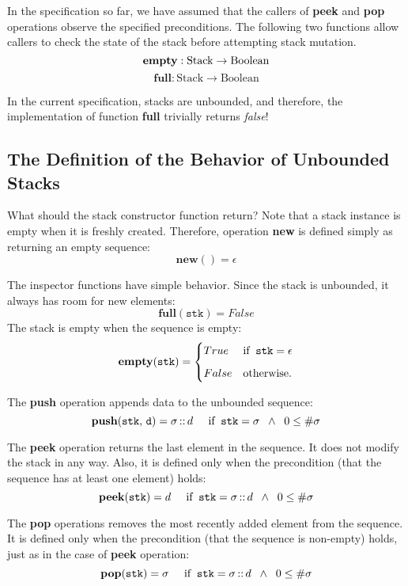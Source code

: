 \documentclass[10pt]{article}
\begin{document}
In the specification so far, we have assumed that the callers of {\textbf{peek}} and {\textbf{pop}} operations observe the specified preconditions. The following two functions allow callers to check the state of the stack before attempting stack mutation.
\[
\textbf{empty}: \mathrm{Stack} \rightarrow \mathrm{Boolean}\vspace*{4pt}\\
\]
\[
\textbf{full}: \mathrm{Stack} \rightarrow \mathrm{Boolean}
\]

\noindent In the current specification, stacks are unbounded, and therefore, the implementation of function {\textbf{full}} trivially returns \emph{false}!

\subsection{The Definition of the Behavior of Unbounded Stacks}
What should the stack constructor function return? Note that a stack instance is empty when it is freshly created. Therefore, operation \textbf{new} is defined simply as returning an empty sequence:
\[
    \mathtt{\mathbf{new}()} = \epsilon
\]

The inspector functions have simple behavior. Since the stack is unbounded, it always has room for new elements:
\[
    \mathtt{\mathbf{full}(stk)} = False 
\]
\noindent The stack is empty when the sequence is empty:
\[
    \mathtt{\mathbf{empty}(stk)} = \begin{cases} True & \mbox{if\;\;} \mathtt{stk} = \epsilon \vspace*{6pt}\\ 
    False & \mbox{otherwise}. \end{cases} 
\]

The \textbf{push} operation appends data to the unbounded sequence:
\[
    \mathtt{\mathbf{push}(stk,\, d)} = \sigma \,\mathbf{::}\, d \;\;\;\;\; \mbox{if\;\;} \mathtt{stk} = \sigma \;\; \wedge \;\; 0 \leq \#\sigma
\]

The \textbf{peek} operation returns the last element in the sequence. It does not modify the stack in any way. Also, it is defined only when the precondition (that the sequence has at least one element) holds:
\[
    \mathtt{\mathbf{peek}(stk)} = d \;\;\;\;\; \mbox{if\;\;} \mathtt{stk} = \sigma \,\mathbf{::} \,d \;\; \wedge \;\; 0 \leq \#\sigma
\]

The \textbf{pop} operations removes the most recently added element from the sequence. It is defined only when the precondition (that the sequence is non-empty) holds, just as in the case of \textbf{peek} operation:
\[
    \mathtt{\mathbf{pop}(stk)} = \sigma \;\;\;\;\; \mbox{if\;\;} \mathtt{stk} = \sigma \,\mathbf{::} \,d \;\; \wedge \;\; 0 \leq \#\sigma
\]
\end{document}
